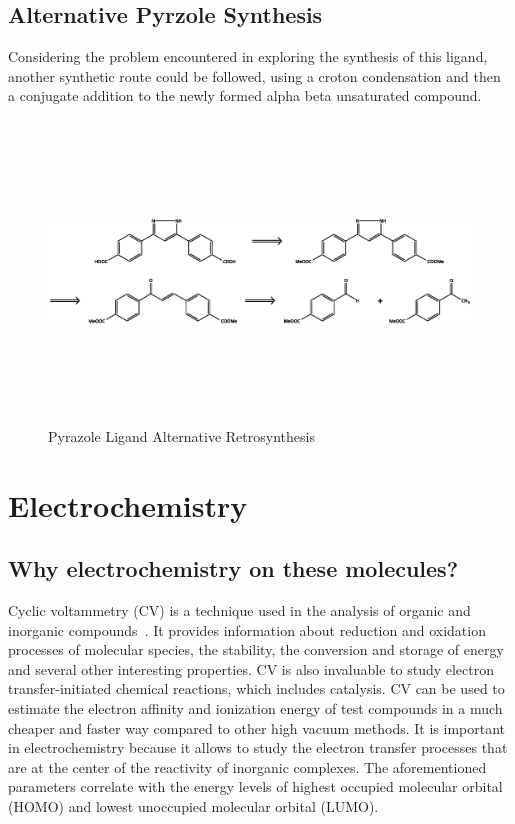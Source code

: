 \documentclass[../Master.tex]{subfiles}
\begin{document}
\subsection{Alternative Pyrzole Synthesis}\label{sec:alt-pyrazole-synthe}

Considering the problem encountered in exploring the synthesis of this ligand, another synthetic route could be followed, using a croton condensation and then a conjugate addition to the newly formed alpha beta unsaturated compound.

\begin{figure}[h!]
	\centering
	\includegraphics[width=16cm,height=8cm,keepaspectratio]{Structures/pyrazole-retro-alt.eps}
	\caption{Pyrazole Ligand Alternative Retrosynthesis}\label{fig:pyrazole-retro-alt}
\end{figure}

\section{Electrochemistry}\label{sec:electrochemistry}

\subsection{Why electrochemistry on these molecules?}\label{sec:elect-intro}

Cyclic voltammetry (CV) is a technique used in the analysis of organic and inorganic compounds\ \cite{elgrishi_practical_2018}. It provides information about reduction and oxidation processes of molecular species, the stability, the conversion and storage of energy and several other interesting properties. CV is also invaluable to study electron transfer-initiated chemical reactions, which includes catalysis. CV can be used to estimate the electron affinity and ionization energy of test compounds in a much cheaper and faster way compared to other high vacuum methods. It is important in electrochemistry because it allows to study the electron transfer processes that are at the center of the reactivity of inorganic complexes.
The aforementioned parameters correlate with the energy levels of highest occupied molecular orbital (HOMO) and lowest unoccupied molecular orbital (LUMO).
\end{document}

